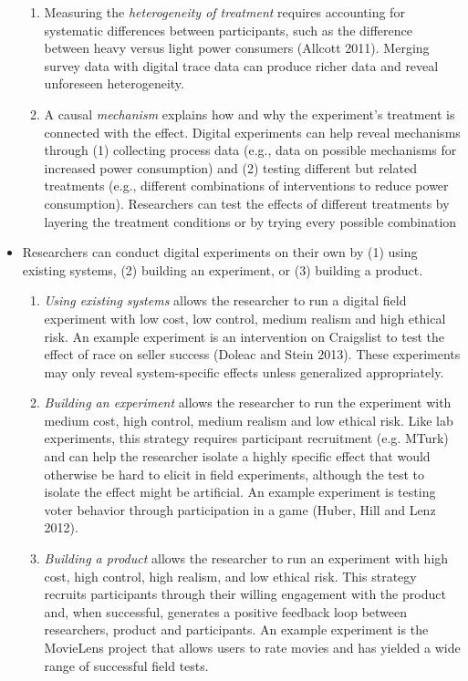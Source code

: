 \documentclass[11pt,letterpaper]{article}
\begin{document}
\begin{itemize}
\begin{enumerate}
\item Measuring the \emph{heterogeneity of treatment} requires accounting for systematic differences between participants, such as the difference between heavy versus light power consumers (Allcott 2011). Merging survey data with digital trace data can produce richer data and reveal unforeseen heterogeneity.
\item A causal \emph{mechanism} explains how and why the experiment's treatment is connected with the effect. Digital experiments can help reveal mechanisms through (1) collecting process data (e.g., data on possible mechanisms for increased power consumption) and (2) testing different but related treatments (e.g., different combinations of interventions to reduce power consumption). Researchers can test the effects of different treatments by layering the treatment conditions or by trying every possible combination 
\end{enumerate}
\item Researchers can conduct digital experiments on their own by (1) using existing systems, (2) building an experiment, or (3) building a product.
\begin{enumerate}
\item \emph{Using existing systems} allows the researcher to run a digital field experiment with low cost, low control, medium realism and high ethical risk. An example experiment is an intervention on Craigslist to test the effect of race on seller success (Doleac and Stein 2013). These experiments may only reveal system-specific effects unless generalized appropriately.
\item \emph{Building an experiment} allows the researcher to run the experiment with medium cost, high control, medium realism and low ethical risk. Like lab experiments, this strategy requires participant recruitment (e.g. MTurk) and can help the researcher isolate a highly specific effect that would otherwise be hard to elicit in field experiments, although the test to isolate the effect might be artificial. An example experiment is testing voter behavior through participation in a game (Huber, Hill and Lenz 2012). 
\item \emph{Building a product} allows the researcher to run an experiment with high cost, high control, high realism, and low ethical risk. This strategy recruits participants through their willing engagement with the product and, when successful, generates a positive feedback loop between researchers, product and participants. An example experiment is the MovieLens project that allows users to rate movies and has yielded a wide range of successful field tests.

\end{enumerate}
\end{itemize}
\end{document}
